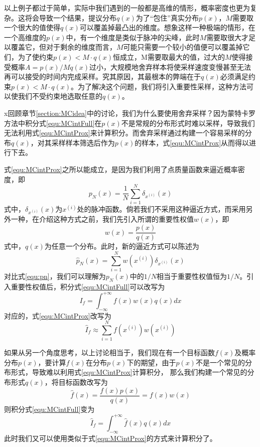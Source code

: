 以上例子都过于简单，实际中我们遇到的一般都是高维的情形，概率密度也更为复杂。这将会导致一个结果，提议分布$q(x)$为了“包住”真实分布$p(x)$，$M$需要取一个很大的值使得$q(x)$可以覆盖掉最凸出的维度。想象这样一种极端的情形，在一个高维度的$p(x)$中，有一个维度是类似于脉冲的尖峰，此时$M$需要取很大才足以覆盖它，但对于剩余的维度而言，$M$可能只需要一个较小的值便可以覆盖掉它们，为了使约束$p(x)< M\cdot q(x)$恒成立，M需要取最大的值，过大的$M$使得接受概率$A = p(x)/Mq(x)$过小，大规模地舍弃样本将使采样速度变慢甚至无法再可以接受的时间内完成采样。究其原因，其最根本的弊端在于$q(x)$必须满足约束$p(x)< M\cdot q(x)$。为了解决这个问题，我们将引入重要性采样，这种方法可以使我们不受约束地选取任意的$q(x)$。


x回顾章节\ref{section:MCidea}中的讨论，我们为什么要使用舍弃采样？因为蒙特卡罗方法中积分式\eqref{equ:MCintFull}在$p(x)$不是常规的分布形式时难以采样，导致我们无法利用式\eqref{equ:MCintProx}来计算积分。而舍弃采样通过构建一个容易采样的分布$q(x)$，对其采样样本筛选后作为$p(x)$的样本，式\eqref{equ:MCintProx}从而得以进行下去。

式\eqref{equ:MCintProx}之所以能成立，是因为我们利用了点质量函数来逼近概率密度，即
\begin{equation}\label{equ:pn}
p_N(x) = \frac{1}{N}\sum\limits_{i=1}^N \delta_{x^{(i)}}(x)
\end{equation}
式中，$\delta_{x^{(i)}}(x)$为$x^{(i)}$处的脉冲函数。倘若我们不采用这种逼近方式，而采用另外一种，在介绍这种方式之前，我们先引入所谓的重要性权值$w(x)$，即
\begin{equation}
w(x) = \frac{p(x)}{q(x)}
\end{equation}
式中，$q(x)$为任意一个分布。此时，新的逼近方式可以陈述为
\begin{equation}
\hat{p}_N(x) = \sum\limits_{i=1}^N w(x^{(i)})\delta_{x^{(i)}}(x)
\end{equation}
对比式\eqref{equ:pn}，我们可以理解为$p_N(x)$中的$1/N$相当于重要性权值恒为$1/N$。引入重要性权值后，积分式\eqref{equ:MCintFull}可以改写为
\begin{equation}
I_f = \int_{-\infty}^{+\infty} f(x)w(x)q(x) dx
\end{equation}
对应的，式\eqref{equ:MCintProx}改写为
\begin{equation}
\hat{I}_f \approx \sum\limits_{i=1}^N f(x^{(i)}) w(x^{(i)})
\end{equation}

如果从另一个角度思考，以上讨论相当于，我们现在有一个目标函数$f(x)$及概率分布$p(x)$，要计算$f(x)$在分布$p(x)$下的期望，由于$p(x)$不是一个常见的分布形式，导致难以利用式\eqref{equ:MCintProx}计算积分， 那么我们构建一个常见的分布形式$q(x)$，将目标函数改写为
\begin{equation}
\hat{f}(x) = \frac{f(x)p(x)}{q(x)} = f(x)w(x)
\end{equation}
则积分式\eqref{equ:MCintFull}变为
\begin{equation}
\hat{I}_f =  \int_{-\infty}^{+\infty} \hat{f}(x)q(x) dx
\end{equation}
此时我们又可以使用类似于式\eqref{equ:MCintProx}的方式来计算积分了。


